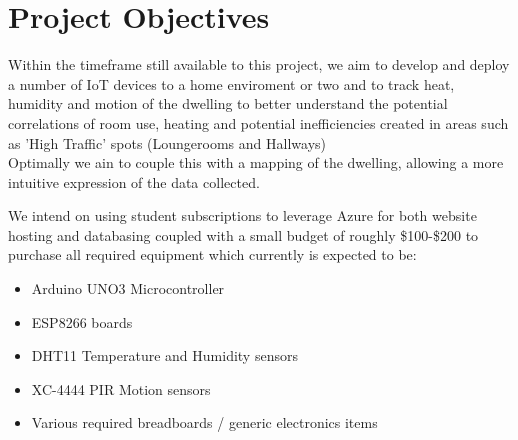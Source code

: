 \documentclass{article}
\begin{document}
    \section{Project Objectives}
        Within the timeframe still available to this project, we aim to develop and deploy a number of 
        IoT devices\cite{ESP8266} to a home enviroment or two and to track heat, humidity and motion of the
        dwelling to better understand the potential correlations of room use, heating and potential 
        inefficiencies created in areas such as 'High Traffic' spots (Loungerooms and Hallways)
        \\
        Optimally we ain to couple this with a mapping of the dwelling, allowing a more intuitive expression 
        of the data collected.
        \par
        We intend on using student subscriptions to leverage Azure for both website hosting and databasing 
        coupled with a small budget of roughly \$100-\$200 to purchase all required equipment which currently
        is expected to be:
        \begin{itemize}
            \item Arduino UNO3 Microcontroller
            \item ESP8266 boards
            \item DHT11 Temperature and Humidity sensors\cite{DHT11}
            \item XC-4444 PIR Motion sensors\cite{XC-4444}
            \item Various required breadboards / generic electronics items
        \end{itemize}

        \vspace{10mm}
\end{document}

